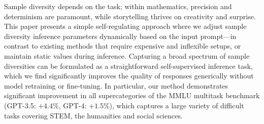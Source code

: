 Sample diversity depends on the task; within mathematics, precision and determinism are paramount, while storytelling thrives on creativity and surprise. This paper presents a simple self-regulating approach where we adjust sample diversity inference parameters dynamically based on the input prompt—in contrast to existing methods that require expensive and inflexible setups, or maintain static values during inference. Capturing a broad spectrum of sample diversities can be formulated as a straightforward self-supervised inference task, which we find significantly improves the quality of responses generically without model retraining or fine-tuning. In particular, our method demonstrates significant improvement in all supercategories of the MMLU multitask benchmark (GPT-3.5: $+4.4\%$, GPT-4: $+1.5\%$), which captures a large variety of difficult tasks covering STEM, the humanities and social sciences.